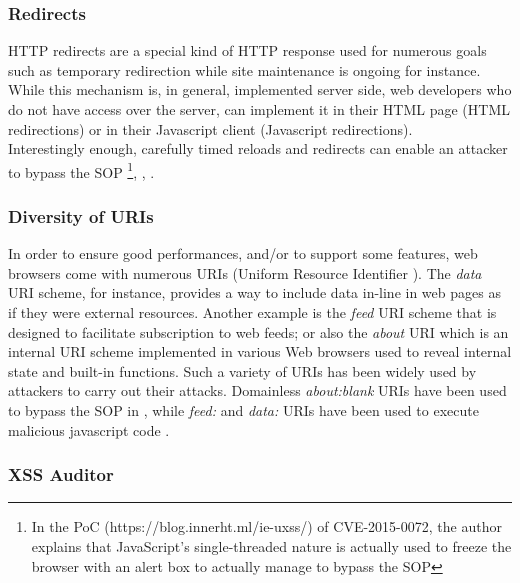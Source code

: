 \documentclass[journal]{IEEEtran}
\begin{document}
\medskip

\subsubsection*{\textbf{Redirects}}

HTTP redirects are a special kind of HTTP response used for numerous goals such as temporary redirection while site maintenance is ongoing for instance. While this mechanism is, in general, implemented server side, web developers who do not have access over the server, can implement it in their HTML page (HTML redirections) or in their Javascript client (Javascript redirections). \\
Interestingly enough, carefully timed reloads and redirects can enable an attacker to bypass the SOP \cite{CVE-2015-0072}\footnote{In the PoC (https://blog.innerht.ml/ie-uxss/) of CVE-2015-0072, the author explains that JavaScript's single-threaded nature is actually used to freeze the browser with an alert box to actually manage to bypass the SOP}, \cite{CVE-2010-4045}, \cite{CVE-2009-3013}.

\medskip

\subsubsection*{\textbf{Diversity of URIs}}

In order to ensure good performances, and/or to support some features, web browsers come with numerous URIs (Uniform Resource Identifier ). The \emph{data} URI scheme, for instance, provides a way to include data in-line in web pages as if they were external resources. Another example is the \emph{feed} URI scheme that is designed to facilitate subscription to web feeds; or also the \emph{about} URI which is an internal URI scheme implemented in various Web browsers used to reveal internal state and built-in functions. Such a variety of URIs has been widely used by attackers to carry out their attacks. Domainless \emph{about:blank} URIs have been used to bypass the SOP in \cite{domainlessAboutBlank}, while \emph{feed:} and \emph{data:} URIs have been used to execute malicious javascript code \cite{CVE-2012-1966} \cite{CVE-2012-1965} \cite{CVE-2011-2609} \cite{CVE-2012-6463} \cite{CVE-2010-2665}.

\medskip

\subsubsection*{\textbf{XSS Auditor}}
\end{document}
